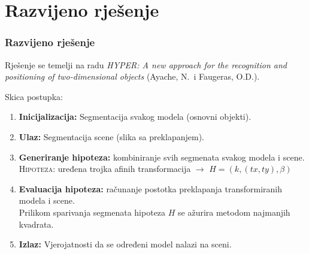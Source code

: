 \documentclass{beamer}
\begin{document}
\section{Razvijeno rješenje}
\begin{frame}
\frametitle{Razvijeno rješenje}
Rješenje se temelji na radu \emph{HYPER: A new approach for the recognition and positioning of two-dimensional objects} (Ayache, N.\ i Faugeras, O.D.).

\pause
Skica postupka:
\begin{enumerate}
  \item<2-> \textbf{Inicijalizacija:} Segmentacija svakog modela (osnovni objekti).
  \item<3-> \textbf{Ulaz:} Segmentacija scene (slika sa preklapanjem).
  \item<4-> \textbf{Generiranje hipoteza:} kombiniranje svih segmenata svakog modela i scene.\\
  \textsc{Hipoteza:} uređena trojka afinih transformacija $\rightarrow$ $H=\left(k, (tx, ty), \beta \right)$
  \item<5-> \textbf{Evaluacija hipoteza:} računanje postotka preklapanja transformiranih modela i scene.\\
  Prilikom sparivanja segmenata hipoteza $H$ se ažurira metodom najmanjih kvadrata.
  \item<6-> \textbf{Izlaz:} Vjerojatnosti da se određeni model nalazi na sceni.
\end{enumerate}
\end{frame}
\end{document}
